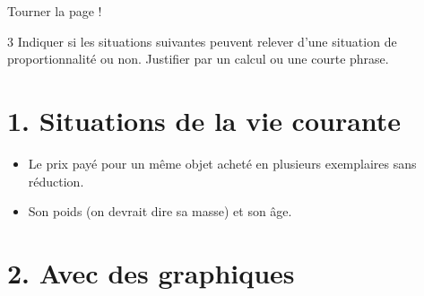 \documentclass[a4paper]{book}
\begin{document}
{\vfill
\hfill Tourner la page !

\newpage


    \begin{exerciceNote}{3}        
        Indiquer si les situations suivantes peuvent relever d'une situation de proportionnalité ou non. Justifier par un calcul ou une courte phrase.


        \section*{1. Situations de la vie courante}

        \begin{itemize}
            \item Le prix payé pour un même objet acheté en plusieurs exemplaires sans réduction. 

            \medskip
            \dotfill

            \item Son poids (on devrait dire sa masse) et son âge. 

            \medskip
            \dotfill
        \end{itemize}

        \section*{2. Avec des graphiques}

        \begin{minipage}{0.30\linewidth}
            \begin{center}
            \end{center}


\end{minipage}
\end{exerciceNote}}
\end{document}
